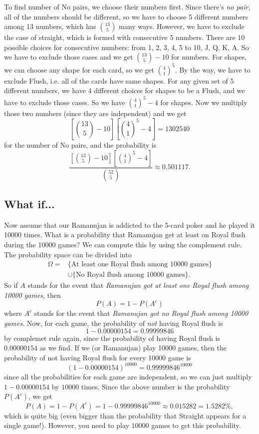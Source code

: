 \documentclass{article}
\begin{document}
To find number of No pairs, we choose their numbers first. 
Since there's \emph{no pair}, all of the numbers should be different, so we have to choose 5 different numbers among 13 numbers, which has $\binom{13}{5}$ many ways. 
However, we have to exclude the case of straight, which is formed with consecutive 5 numbers. 
There are 10 possible choices for consecutive numbers: from 1, 2, 3, 4, 5 to 10, J, Q, K, A. 
So we have to exclude those cases and we get $\binom{13}{5} - 10$ for numbers. 
For shapes, we can choose any shape for each card, so we get $\binom{4}{1}^{5}$. 
By the way, we have to exclude Flush, i.e. all of the cards have same shapes. 
For any given set of 5 different numbers, we have 4 different choices for shapes to be a Flush, and we have to exclude those cases. 
So we have $\binom{4}{1}^{5} - 4$ for shapes. 
Now we multiply those two numbers (since they are independent) and we get
$$
\left[\binom{13}{5} - 10\right]\left[\binom{4}{1}^{5} - 4\right] = 1302540
$$
for the number of No pairs, and the probability is 
$$
\frac{\left[\binom{13}{5} - 10\right]\left[\binom{4}{1}^{5} - 4\right] }{\binom{52}{5}} \approx 0.501117.
$$

\subsection*{What if...}

Now assume that our Ramanujan is addicted to the 5-card poker and he played it 10000 times. What is a probability that Ramanujan get at least on Royal flush during the 10000 games? 
We can compute this by using the complement rule. The probability space can be divided into 
\begin{align*}
\Omega = &\{\text{At least one Royal flush among 10000 games}\} \\
 &\cup \{\text{No Royal flush among 10000 games}\}.
\end{align*}
So if $A$ stands for the event that \emph{Ramanujan got at least one Royal flush among 10000 games}, then $$P(A) = 1-P(A^{c})$$ where $A^{c}$ stands for the event that \emph{Ramanujan got no Royal flush among 10000 games}. 
Now, for each game, the probability of \emph{not} having Royal flush is $$1 - 0.00000154 = 0.99999846$$ by complemet rule again, since the probability of having Royal flush is $0.00000154$ as we find.  
If we (or Ramanujan) play 10000 games, then the probability of not having Royal flush for every 10000 game is 
$$
(1-0.00000154)^{10000} = 0.99999846^{10000}
$$
since all the probabilities for each game are independent, so we can just multiply $1-0.00000154$ by $10000$ times. Since the above number is the probability $P(A^{c})$, we get
$$
P(A) = 1- P(A^{c}) = 1- 0.99999846^{10000} \approx 0.015282 = 1.5282\%, 
$$
which is quite big (even bigger than the probability that Straight appears for a single game!). 
However, you need to play $10000$ games to get this probability. 
\end{document}
